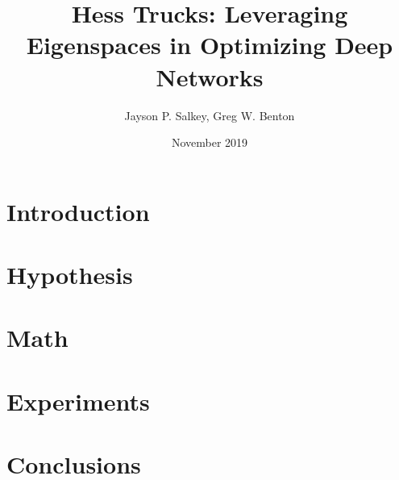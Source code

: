 \documentclass{article}
\title{Hess Trucks: Leveraging Eigenspaces in Optimizing Deep Networks}
\author{Jayson P. Salkey, Greg W. Benton}
\date{November 2019}
\begin{document}
\maketitle

\section{Introduction}

\section{Hypothesis}











\section{Math}

\section{Experiments}

\section{Conclusions}
\end{document}
